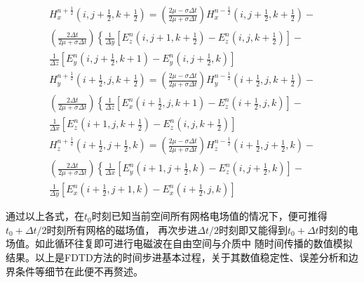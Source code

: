  \begin{equation} 
\begin{array}{l}{H_{x}^{n+\frac{1}{2}}\left(i, j+\frac{1}{2}, k+\frac{1}{2}\right)=\left(\frac{2 \mu-\sigma \Delta t}{2 \mu+\sigma \Delta t}\right) H_{x}^{n-\frac{1}{2}}\left(i, j+\frac{1}{2}, k+\frac{1}{2}\right)-} \\ {\left(\frac{2 \Delta t}{2 \mu+\sigma \Delta t}\right)\left\{\frac{1}{\Delta y}\left[E_{z}^{n}\left(i, j+1, k+\frac{1}{2}\right)-E_{z}^{n}\left(i, j, k+\frac{1}{2}\right)\right]-\right.} \\ {\frac{1}{\Delta z}\left[E_{y}^{n}\left(i, j+\frac{1}{2}, k+1\right)-E_{y}^{n}\left(i, j+\frac{1}{2}, k\right)\right]}\end{array}
 \end{equation}
 \begin{equation} 
\begin{array}{l}{H_{y}^{n+\frac{1}{2}}\left(i+\frac{1}{2}, j, k+\frac{1}{2}\right)=\left(\frac{2 \mu-\sigma \Delta t}{2 \mu+\sigma \Delta t}\right) H_{y}^{n-\frac{1}{2}}\left(i+\frac{1}{2}, j, k+\frac{1}{2}\right)-} \\ {\left(\frac{2 \Delta t}{2 \mu+\sigma \Delta t}\right)\left\{\frac{1}{\Delta z}\left[E_{x}^{n}\left(i+\frac{1}{2}, j, k+1\right)-E_{z}^{n}\left(i+\frac{1}{2}, j, k\right)\right]-\right.} \\ {\frac{1}{\Delta x}\left[E_{z}^{n}\left(i+1, j, k+\frac{1}{2}\right)-E_{z}^{n}\left(i, j, k+\frac{1}{2}\right)\right]}\end{array}
 \end{equation}
 \begin{equation} 
\begin{array}{l}{H_{z}^{n+\frac{1}{2}}\left(i+\frac{1}{2}, j+\frac{1}{2}, k\right)=\left(\frac{2 \mu-\sigma \Delta t}{2 \mu+\sigma \Delta t}\right) H_{z}^{n-\frac{1}{2}}\left(i+\frac{1}{2}, j+\frac{1}{2}, k\right)-} \\ {\left(\frac{2 \Delta t}{2 \mu+\sigma \Delta t}\right)\left\{\frac{1}{\Delta x}\left[E_{y}^{n}\left(i+1, j+\frac{1}{2}, k\right)-E_{z}^{n}\left(i, j+\frac{1}{2}, k\right)\right]-\right.} \\ {\frac{1}{\Delta y}\left[E_{x}^{n}\left(i+\frac{1}{2}, j+1, k\right)-E_{x}^{n}\left(i+\frac{1}{2}, j, k\right)\right]}\end{array}
 \end{equation}

通过以上各式，在$t_0$时刻已知当前空间所有网格电场值的情况下，便可推得$t_0+{\Delta t}/2$时刻所有网格的磁场值，
再次步进${\Delta t}/2$时刻即又能得到$t_0+\Delta t$时刻的电场值。如此循环往复即可进行电磁波在自由空间与介质中
随时间传播的数值模拟结果。以上是FDTD方法的时间步进基本过程，关于其数值稳定性、误差分析和边界条件等细节在此便不再赘述。
